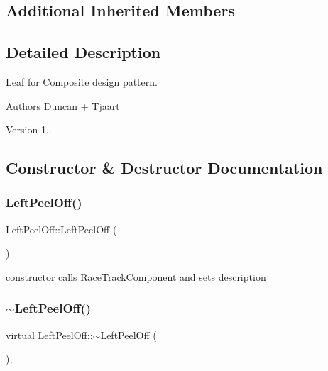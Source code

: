 \subsection*{Additional Inherited Members}


\subsection{Detailed Description}
Leaf for Composite design pattern. 

\begin{DoxyAuthor}{Authors}
Duncan + Tjaart 
\end{DoxyAuthor}
\begin{DoxyVersion}{Version}
1.. 
\end{DoxyVersion}


\subsection{Constructor \& Destructor Documentation}
\mbox{\label{class_left_peel_off_ac4d742f0198c55a5a5dd46ebc74ea479}} 
\subsubsection{\texorpdfstring{Left\+Peel\+Off()}{LeftPeelOff()}}
{\footnotesize\ttfamily Left\+Peel\+Off\+::\+Left\+Peel\+Off (\begin{DoxyParamCaption}{ }\end{DoxyParamCaption})\hspace{0.3cm}{\ttfamily [inline]}}

constructor calls \mbox{\hyperlink{class_race_track_component}{Race\+Track\+Component}} and sets description \mbox{\label{class_left_peel_off_af1283064ef653388d605a1acac67caf3}} 
\subsubsection{\texorpdfstring{$\sim$\+Left\+Peel\+Off()}{~LeftPeelOff()}}
{\footnotesize\ttfamily virtual Left\+Peel\+Off\+::$\sim$\+Left\+Peel\+Off (\begin{DoxyParamCaption}{ }\end{DoxyParamCaption})\hspace{0.3cm}{\ttfamily [inline]}, {\ttfamily [virtual]}}

